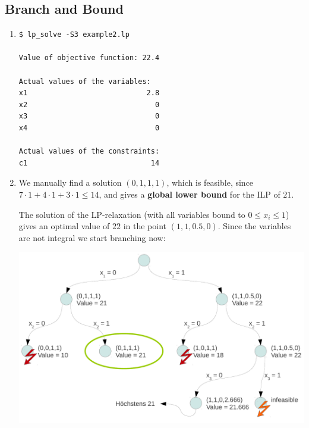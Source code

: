 \documentclass[a4paper, oneside]{scrartcl}
\begin{document}
\subsection{Branch and Bound}

\begin{enumerate}
  \item 
\begin{verbatim}
$ lp_solve -S3 example2.lp 

Value of objective function: 22.4

Actual values of the variables:
x1                            2.8
x2                              0
x3                              0
x4                              0

Actual values of the constraints:
c1                             14
\end{verbatim}
  \item 
  
We manually find a solution $(0,1,1,1)$, which is feasible, 
since $7 \cdot 1 + 4 \cdot 1 + 3 \cdot 1 \leq 14$, 
and gives a \textbf{global lower bound} for the ILP of $21$.

The solution of the LP-relaxation (with all variables bound to $0 \leq x_i \leq 1$)
gives an optimal value of $22$ in the point $(1,1,0.5,0)$. 
Since the variables are not integral we start branching now:

\begin{center}
\includegraphics[width=\textwidth]{branchANDbound_ex9.pdf}
\end{center}


\end{enumerate}
\end{document}
